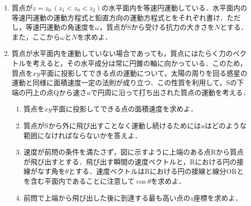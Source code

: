 \begin{enumerate}[I]
  \item {\hzw} 質点が$z = z_0\ (z_1 < z_0 < z_2)$の水平面内を等速円運動している．水平面内の等速円運動の運動方程式と鉛直方向の運動方程式とをそれぞれ書け．ただし，等速円運動の角速度を$\omega$，質点がSから受ける抗力の大きさを$N$とする．また，ここから$\omega$と$N$を求めよ．
  \item {\hzw}質点が水平面内を運動していない場合であっても，質点にはたらく力のベクトルを考えると，その水平成分は常に円錐の軸に向かっている．このため，質点を$xy$平面に投影してできる点の運動について，太陽の周りを回る惑星の運動と同様に面積速度一定の法則が成り立つ．この性質を利用して，Sの下端の円上の点Qから速さ$u$で円周に沿って打ち出された質点の運動を考える．
  \begin{enumerate}[label={問\arabic*}]
    \item {\hzw}質点を$xy$平面に投影してできる点の面積速度を求めよ．
    \item {\hzw}質点がSから外に飛び出すことなく運動し続けるためには$u$はどのような範囲になければならないかを答えよ．
    \item {\hzw}速度が前問の条件を満たさず，図に示すように上端のある点Rから質点が飛び出すとする．飛び出す瞬間の速度ベクトルと，Rにおける円の接線がなす角を$\theta$とする．速度ベクトルはRにおける円の接線と線分ORとを含む平面内であることに注意して$\cos\theta$を求めよ．
    \item {\hzw}前問で上端から飛び出した後に到達する最も高い点の$z$座標を求めよ．
  \end{enumerate}
\end{enumerate}

